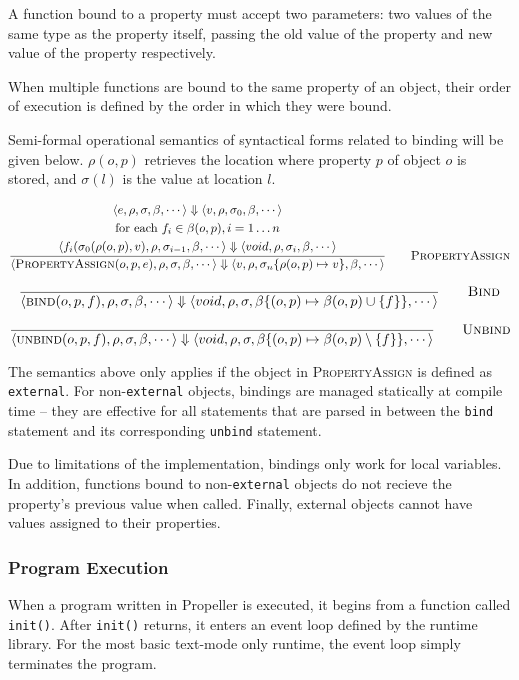 A function bound to a property must accept two parameters: two values of the same type as the property
itself, passing the old value of the property and new value of the property respectively.

When multiple functions are bound to the same property of an object, their order of execution is defined by the order in which they were
bound.

Semi-formal operational semantics of syntactical forms related to binding will be given below.
$\rho(o, p)$ retrieves the location where property $p$ of object $o$ is stored, and $\sigma(l)$ is
the value at location $l$.

$$
\dfrac{\begin{gathered}
\langle e,\rho,\sigma,\beta,\cdots \rangle \Downarrow
\langle v,\rho,\sigma_0,\beta,\cdots \rangle\\
\textrm{for each } f_i\in\beta(o, p), i=1\dots n\\
\langle f_i(\sigma_0(\rho(o,p),v),\rho,\sigma_{i-1},\beta,\cdots \rangle \Downarrow
\langle void,\rho,\sigma_i,\beta,\cdots \rangle
\end{gathered}
}
{\langle \textsc{PropertyAssign}(o,p,e),\rho,\sigma,\beta,\cdots \rangle
\Downarrow
\langle v,\rho,\sigma_n\{\rho(o,p)\mapsto v\},\beta,\cdots \rangle
} \qquad \textsc{PropertyAssign}
$$

$$
\dfrac{}
{\langle \textsc{bind}(o,p,f),\rho,\sigma,\beta,\cdots \rangle
\Downarrow
\langle void,\rho,\sigma,\beta\{(o,p)\mapsto \beta(o,p)\cup \{f\}\},\cdots \rangle
} \qquad \textsc{Bind}
$$

$$
\dfrac{}
{\langle \textsc{unbind}(o,p,f),\rho,\sigma,\beta,\cdots \rangle
\Downarrow
\langle void,\rho,\sigma,\beta\{(o,p)\mapsto \beta(o,p)\setminus \{f\}\},\cdots \rangle
} \qquad \textsc{Unbind}
$$

The semantics above only applies if the object in \textsc{PropertyAssign} is defined as
\texttt{external}. For non-\texttt{external} objects, bindings are managed statically at compile
time -- they are effective for all statements that are parsed in between the \verb|bind| statement
and its corresponding \verb|unbind| statement.

Due to limitations of the implementation, bindings only work for local variables. In addition,
functions bound to non-\texttt{external} objects do not recieve the property's previous value when called. Finally, external
objects cannot have values assigned to their properties.

\subsubsection{Program Execution}

When a program written in Propeller is executed, it begins from a function called \verb|init()|.
After \verb|init()| returns, it enters an event loop defined by the runtime library. For the
most basic text-mode only runtime, the event loop simply terminates the program.
